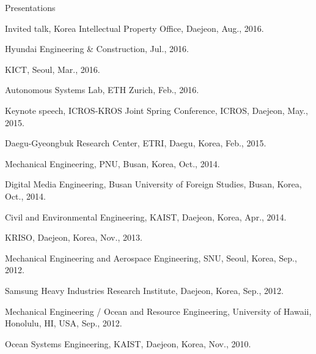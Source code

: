 \begin{rSection}{Presentations}
\begin{pubSubsectionNum}{}
  \item Invited talk, Korea Intellectual Property Office, Daejeon, Aug., 2016.

  \item Hyundai Engineering \& Construction, Jul., 2016.

  \item \ac{KICT}, Seoul, Mar., 2016.

  \item Autonomous Systems Lab, ETH Zurich, Feb., 2016.

  \item Keynote speech, ICROS-KROS Joint Spring Conference, \ac{ICROS}, Daejeon, May., 2015.

  \item Daegu-Gyeongbuk Research Center, \ac{ETRI}, Daegu, Korea, Feb., 2015.
  \item Mechanical Engineering, \ac{PNU}, Busan, Korea, Oct., 2014.
  \item Digital Media Engineering, Busan University of Foreign Studies, Busan, Korea, Oct., 2014.
  \item Civil and Environmental Engineering, \ac{KAIST}, Daejeon, Korea, Apr., 2014.
  \item \ac{KRISO}, Daejeon, Korea, Nov., 2013.
  \item Mechanical Engineering and Aerospace Engineering, \ac{SNU}, Seoul, Korea, Sep., 2012.
  \item Samsung Heavy Industries Research Institute, Daejeon, Korea, Sep., 2012.
  \item Mechanical Engineering / Ocean and Resource Engineering, University of Hawaii, Honolulu, HI, USA, Sep., 2012.
  \item Ocean Systems Engineering, \ac{KAIST}, Daejeon, Korea, Nov., 2010.
\end{pubSubsectionNum}

\end{rSection}
